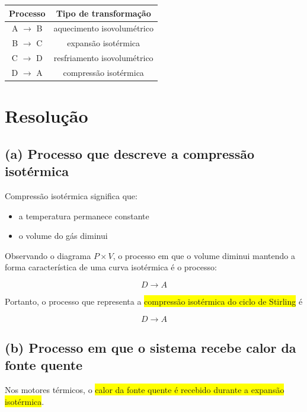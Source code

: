 \documentclass[a4paper,12pt]{article}
\begin{document}
\begin{center}
\begin{tabular}{c c}
Processo & Tipo de transformação \\
\hline
\colorbox{roxofigura!50}{A $\rightarrow$ B} & \colorbox{roxofigura!50}{aquecimento isovolumétrico} \\
\colorbox{blue!40}{B $\rightarrow$ C} & \colorbox{blue!40}{expansão isotérmica} \\
\colorbox{red!40}{C $\rightarrow$ D} & \colorbox{red!40}{resfriamento isovolumétrico} \\
\colorbox{azulclaro!35}{D $\rightarrow$ A} & \colorbox{azulclaro!35}{compressão isotérmica} \\
\end{tabular}
\end{center}

\section*{Resolução}

\subsection*{(a) Processo que descreve a compressão isotérmica}

Compressão isotérmica significa que:

\begin{itemize}
\item a temperatura permanece constante
\item o volume do gás diminui
\end{itemize}

Observando o diagrama $P \times V$, o processo em que o volume diminui mantendo a forma 
característica de uma curva isotérmica é o processo:

\[
D \rightarrow A
\]

Portanto, o processo que representa a \colorbox{yellow}{compressão isotérmica do ciclo de Stirling} é

\[
\boxed{D \rightarrow A}
\]

\subsection*{(b) Processo em que o sistema recebe calor da fonte quente}

Nos motores térmicos, o \colorbox{yellow}{calor da fonte quente é recebido durante a expansão isotérmica}.
\end{document}
